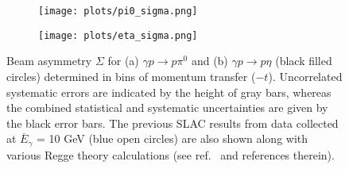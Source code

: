 \begin{figure}[H]
    \centering
    \begin{subfigure}[b]{0.65\textwidth}
        \texttt{[image: plots/pi0\_sigma.png]}
        \caption{}
        \label{fig.1.3.3.2.a}
    \end{subfigure}\hfill
    \begin{subfigure}[b]{0.65\textwidth}
        \texttt{[image: plots/eta\_sigma.png]}
        \caption{}
        \label{fig.1.3.3.2.b}
    \end{subfigure}
    \caption{ Beam asymmetry $\Sigma$ for (a) $\gamma p \rightarrow p \pi^{0}$ and (b) $\gamma p \rightarrow p \eta$ (black filled circles) determined in bins of momentum transfer ($-t$). Uncorrelated systematic errors are indicated by the height of gray bars, whereas the combined statistical and systematic uncertainties are given by the black error bars. The previous SLAC results from data collected at $\overline{{E}}_{\gamma}$ = 10 GeV (blue open circles) are also shown along with various Regge theory calculations (see ref.~\cite{11} and references therein).}
    \label{fig.1.3.3.2}
\end{figure}

